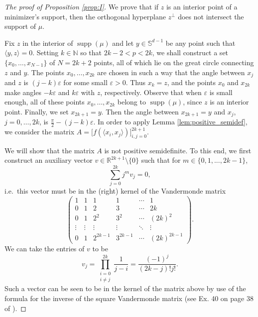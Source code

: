\documentclass[11pt, leqno]{amsart}
\theoremstyle{definition}
\numberwithin{equation}{section}
\begin{document}
\begin{proof}[The proof of Proposition \ref{prop:I}]  
We prove that if $z$ is an interior point of  a minimizer's support, then the orthogonal hyperplane $z^\perp$ does not intersect the support of $\mu$. 

Fix $z$ in the interior of $\operatorname{supp} (\mu)$ and let $y \in \mathbb S^{d-1}$  be any point such that $\langle y, z\rangle = 0$. Setting $k \in \mathbb{N}$ so that $2k-2 < p < 2k$, we shall construct a set $\{ x_0, \dots, x_{N-1} \}$ of $N = 2k + 2$ points, all of which lie on the great circle connecting $z$ and $y$. The points $x_0,\dots, x_{2k}$ are chosen in such a way that the  angle between $x_j$ and $z$ is $ (j-k)\varepsilon$ for some small $\varepsilon >0$. Thus $x_k = z$, and the points $x_0$ and $x_{2k}$ make angles $-k\varepsilon$ and $k\varepsilon$ with $z$, respectively. Observe that when $\varepsilon$ is small enough, all of these points $x_0,\dots,x_{2k}$ belong to  $\operatorname{supp} (\mu)$, since $z$ is an interior point. Finally, we set $ x_{2k+1} = y$. Then the angle between  $ x_{2k+1} = y$ and $x_j$, $j=0,\dots, 2k$, is $\frac{\pi}2 - (j-k) \varepsilon$. In order to apply Lemma \ref{lem:positive_semidef}, we consider the matrix $ \displaystyle{A  =  \big[ f ( \langle x_i , x_j \rangle)  \big]_{i,j=0}^{2k+1}}$.

We will show  that the matrix $A$ is not positive semidefinite. To this end, we first  construct an auxiliary vector  $v \in \mathbb{R}^{2k+1} \setminus \{0 \}$ such that for $m \in \{ 0, 1, ..., 2k-1 \}$,
\begin{equation}\label{e.4.10}
 \sum_{j=0}^{2k} j^m v_j = 0,
 \end{equation}
i.e.\  this vector must be in the (right) kernel of the Vandermonde matrix
$$ \begin{pmatrix}
1 & 1 & 1 & 1 & \cdots & 1 \\
0 & 1 & 2 & 3 &\cdots & 2k \\
0 & 1 & 2^2 & 3^2 & \cdots & (2k)^2 \\
\vdots & \vdots & \vdots & \vdots & \ddots & \vdots \\
0 & 1 & 2^{2k-1} & 3^{2k-1} & \cdots & (2k)^{2k-1}
\end{pmatrix}.$$
We can take  the entries of $v$  to be 
\begin{equation}\label{e.4.11} 
 v_j = \prod_{\substack{i=0 \\ i \neq j}}^{2k} \frac{1}{j-i} =  \frac{(-1)^j}{(2k-j)! j!}.
\end{equation}
Such a vector can be seen to be in the kernel of the matrix above by use of the formula for the inverse of the square Vandermonde matrix (see Ex. 40 on page 38 of \cite{knuth}).


\end{proof}
\end{document}
